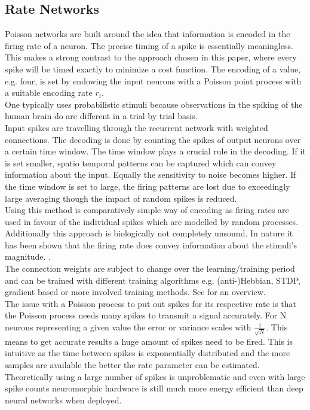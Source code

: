 \subsection{Rate Networks}
Poisson networks are built around the idea that information is encoded in the firing rate of a neuron. The precise timing of a spike is essentially meaningless\cite{brette_philosophy_2015}. This makes a strong contrast to the approach chosen in this paper, where every spike will be timed exactly to minimize a cost function.
The encoding of a value, e.g. four, is set by endowing the input neurons with a Poisson point process with a suitable encoding rate $r_i$\cite{deneve_efficient_2016}.\\
One typically uses probabilistic stimuli because observations in the spiking of the human brain do are different in a trial by trial basis.\\
Input spikes are travelling through the recurrent network with weighted connections. The decoding is done by counting the spikes of output neurons over a certain time window. The time window plays a crucial rule in the decoding. If it is set smaller, spatio temporal patterns can be captured which can convey information about the input. Equally the sensitivity to noise becomes higher. If the time window is set to large, the firing patterns are lost due to exceedingly large averaging though the impact of random spikes is reduced.\\
Using this method is comparatively simple way of encoding as firing rates are used in favour of the individual spikes which are modelled by random processes. Additionally this approach is biologically not completely unsound. In nature it has been shown that the firing rate does convey information about the stimuli's magnitude. \cite{adrian_impulses_1926}.\\
The connection weights are subject to change over the learning/training period\cite{almomani_comparative_2019} and can be trained with different training algorithms e.g. (anti-)Hebbian, STDP, gradient based or more involved training methods\cite{demin_recurrent_2018}. See \cite{yi_learning_2023} for an overview.\\


The issue with a Poisson process to put out spikes for its respective rate is that the Poisson process needs many spikes to transmit a signal accurately. For N neurons representing a given value the error or variance scales with $\frac{1}{\sqrt{N}}$\cite{boerlin_predictive_2013}. This means to get accurate results a huge amount of spikes need to be fired. This is intuitive as the time between spikes is exponentially distributed and the more samples are available the better the rate parameter can be estimated.
Theoretically using a large number of spikes is unproblematic and even with large spike counts neuromorphic hardware is still much more energy efficient than deep neural networks when deployed\cite{indiveri_importance_2019}.


